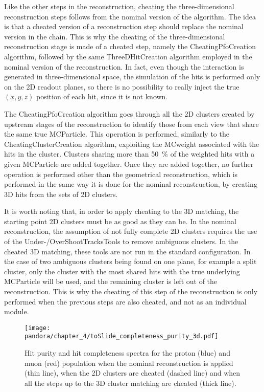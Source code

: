 Like the other steps in the reconstruction, cheating the three-dimensional reconstruction steps follows from the nominal version of the algorithm. The idea is that a cheated version of a reconstruction step should replace the nominal version in the chain. This is why the cheating of the three-dimensional reconstruction stage is made of a cheated step, namely the CheatingPfoCreation algorithm, followed by the same ThreeDHitCreation algorithm employed in the nominal version of the reconstruction. In fact, even though the interaction is generated in three-dimensional space, the simulation of the hits is performed only on the 2D readout planes, so there is no possibility to really inject the true $(x,y,z)$ position of each hit, since it is not known. 

The CheatingPfoCreation algorithm goes through all the 2D clusters created by upstream stages of the reconstruction to identify those from each view that share the same true MCParticle. This operation is performed, similarly to the CheatingClusterCreation algorithm, exploiting the MCweight associated with the hits in the cluster. Clusters sharing more than \SI{50}{\percent} of the weighted hits with a given MCParticle are added together. Once they are added together, no further operation is performed other than the geometrical reconstruction, which is performed in the same way it is done for the nominal reconstruction, by creating 3D hits from the sets of 2D clusters. 

It is worth noting that, in order to apply cheating to the 3D matching, the starting point 2D clusters must be as good as they can be. In the nominal reconstruction, the assumption of not fully complete 2D clusters requires the use of the Under-/OverShootTracksTools to remove ambiguous clusters. In the cheated 3D matching, these tools are not run in the standard configuration. In the case of two ambiguous clusters being found on one plane, for example a split cluster, only the cluster with the most shared hits with the true underlying MCParticle will be used, and the remaining cluster is left out of the reconstruction. This is why the cheating of this step of the reconstruction is only performed when the previous steps are also cheated, and not as an individual module. 

\begin{figure}
    \centering
    \texttt{[image: pandora/chapter\_4/toSlide\_completeness\_purity\_3d.pdf]}
    \caption[Hit purity and completeness with CheatingPfoCreation algorithm]{Hit purity and hit completeness spectra for the proton (blue) and muon (red) population when the nominal reconstruction is applied (thin line), when the 2D clusters are cheated (dashed line) and when all the steps up to the 3D cluster matching are cheated (thick line).}
    \label{fig:hit_purity_completeness_CheatingPfoCreation}
\end{figure}

